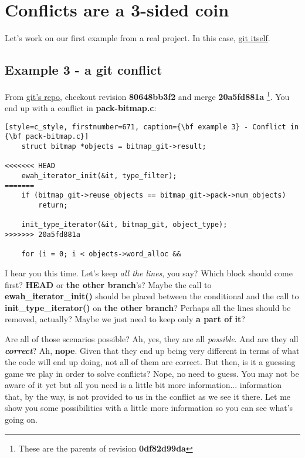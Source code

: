
\section{Conflicts are a 3-sided coin}
\label{diff3}

Let's work on our first example from a real project. In this case, \hyperref[git_repo]{git itself}.

\subsection{Example 3 - a git conflict}
\label{example_03}

From \hyperref[git_repo]{git's repo}, checkout revision {\bf 80648bb3f2} and merge {\bf 20a5fd881a} \footnote{These
are the parents of revision {\bf 0df82d99da}}. You end up with a conflict in {\bf pack-bitmap.c}:
\begin{lstlisting}[style=c_style, firstnumber=671, caption={\bf example 3} - Conflict in {\bf pack-bitmap.c}]
	struct bitmap *objects = bitmap_git->result;

<<<<<<< HEAD
	ewah_iterator_init(&it, type_filter);
=======
	if (bitmap_git->reuse_objects == bitmap_git->pack->num_objects)
		return;

	init_type_iterator(&it, bitmap_git, object_type);
>>>>>>> 20a5fd881a

	for (i = 0; i < objects->word_alloc &&
\end{lstlisting}

I hear you this time. Let's keep {\it all the lines}, you say? Which block should come first? {\bf HEAD} or
{\bf the other branch}'s? Maybe the call to {\bf ewah\_iterator\_init()} should be placed between the conditional and
the call to {\bf init\_type\_iterator()} on {\bf the other branch}? Perhaps all the lines should be removed, actually?
Maybe we just need to keep only {\bf a part of it}?

Are all of those scenarios possible? Ah, yes, they are all {\it possible}. And are they all {\it\bf correct}? Ah, {\bf nope}.
Given that they end up being very different in terms of what the code will end up doing, not all of them are correct. But then,
is it a guessing game we play in order to solve conflicts? Nope, no need to guess. You may not be aware of it yet but all you
need is a little bit more information... information that, by the way, is not provided to us in the conflict as we see it there.
Let me show you some possibilities with a little more information so you can see what's going on.


